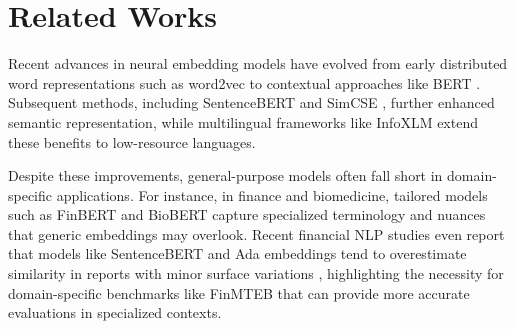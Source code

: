 \section{Related Works}
Recent advances in neural embedding models have evolved from early distributed word representations such as word2vec \citep{mikolov2013efficientestimationwordrepresentations} to contextual approaches like BERT \citep{devlin2019bertpretrainingdeepbidirectional}. Subsequent methods, including SentenceBERT \citep{reimers2019sentencebertsentenceembeddingsusing} and SimCSE \citep{gao2022simcsesimplecontrastivelearning}, further enhanced semantic representation, while multilingual frameworks like InfoXLM \citep{chi2021infoxlminformationtheoreticframeworkcrosslingual} extend these benefits to low-resource languages.

Despite these improvements, general-purpose models often fall short in domain-specific applications. For instance, in finance and biomedicine, tailored models such as FinBERT \citep{araci2019finbertfinancialsentimentanalysis} and BioBERT \citep{Lee_2019} capture specialized terminology and nuances that generic embeddings may overlook. Recent financial NLP studies even report that models like SentenceBERT and Ada embeddings tend to overestimate similarity in reports with minor surface variations \citep{liu2024surfacesimilaritydetectingsubtle}, highlighting the necessity for domain-specific benchmarks like FinMTEB \citep{tang2024needdomainspecificembeddingmodels} that can provide more accurate evaluations in specialized contexts.